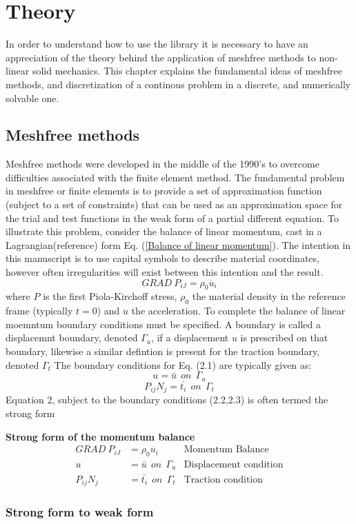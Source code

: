 \chapter{Theory}		
In order to understand how to use the library it is necessary to have an appreciation of the theory behind the application of meshfree methods to non-linear solid mechanics. This chapter explains the fundamental ideas of meshfree methods, and discretization of a continous problem in a discrete, and numerically solvable one. 
\section{Meshfree methods}
Meshfree methods were developed in the middle of the 1990's to overcome difficulties associated with the finite element method. The fundamental problem in meshfree or finite elements is to provide a set of approximation function (subject to a set of constraints) that can be used as an approximation space for the trial and test functions in the weak form of a partial different equation.  To illustrate this problem, consider the balance of linear momentum, cast in a Lagrangian(reference) form Eq. (\ref{Balance of linear momentum}). The intention in this manuscript is to use capital symbols to describe material coordinates, however often irregularities will exist between this intention and the result. 
\begin{equation}\label{Balance of linear momentum}
GRAD ~ P_{iJ} = \rho_0 \ddot{u_i}
\end{equation}
where $P$ is the first Piola-Kirchoff stress, $\rho_0$ the material density in the reference frame (typically $t=0$) and $\ddot{u}$ the acceleration. To complete the balance of linear moemntum boundary conditions must be specified. A boundary is called a displacemnt boundary, denoted $\Gamma_u$, if a displacement $u$ is prescribed on that boundary, likewise a similar defintion is present for the traction boundary, denoted $\Gamma_t$ The boundary conditions for Eq. (2.1) are typically given as:
\begin{equation}
u=\bar{u} ~~on ~~\Gamma_u
\end{equation}
\begin{equation}
P_{ij}N_j = \bar{t_i} ~~on ~~\Gamma_t
\end{equation}
Equation 2, subject to the boundary conditions (2.2,2.3) is often termed the strong form 

\begin{tcolorbox}
\textbf{Strong form of the momentum balance}
\begin{align*}
GRAD ~ P_{iJ} &= \rho_0 \ddot{u_i} &\text{Momentum Balance} \\
u&=\bar{u} ~~on ~~\Gamma_u &\text{Displacement condition} \\
P_{ij}N_j &= \bar{t_i} ~~on ~~\Gamma_t &\text{Traction condition}
\end{align*}
\end{tcolorbox}

\subsection*{Strong form to weak form }